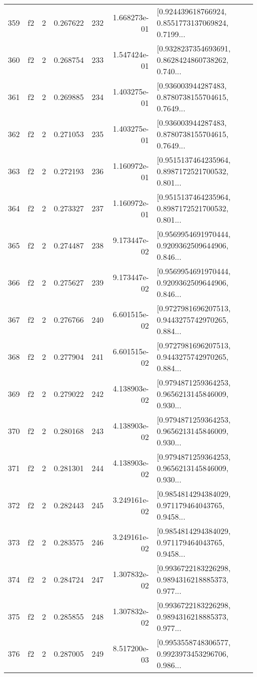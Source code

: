 \begin{tabular}{lllrlrl}
359 &  f2 &   2 &  0.267622 &  232 &  1.668273e-01 &  [0.924439618766924, 0.8551773137069824, 0.7199... \\
360 &  f2 &   2 &  0.268754 &  233 &  1.547424e-01 &  [0.9328237354693691, 0.8628424860738262, 0.740... \\
361 &  f2 &   2 &  0.269885 &  234 &  1.403275e-01 &  [0.936003944287483, 0.8780738155704615, 0.7649... \\
362 &  f2 &   2 &  0.271053 &  235 &  1.403275e-01 &  [0.936003944287483, 0.8780738155704615, 0.7649... \\
363 &  f2 &   2 &  0.272193 &  236 &  1.160972e-01 &  [0.9515137464235964, 0.8987172521700532, 0.801... \\
364 &  f2 &   2 &  0.273327 &  237 &  1.160972e-01 &  [0.9515137464235964, 0.8987172521700532, 0.801... \\
365 &  f2 &   2 &  0.274487 &  238 &  9.173447e-02 &  [0.9569954691970444, 0.9209362509644906, 0.846... \\
366 &  f2 &   2 &  0.275627 &  239 &  9.173447e-02 &  [0.9569954691970444, 0.9209362509644906, 0.846... \\
367 &  f2 &   2 &  0.276766 &  240 &  6.601515e-02 &  [0.9727981696207513, 0.9443275742970265, 0.884... \\
368 &  f2 &   2 &  0.277904 &  241 &  6.601515e-02 &  [0.9727981696207513, 0.9443275742970265, 0.884... \\
369 &  f2 &   2 &  0.279022 &  242 &  4.138903e-02 &  [0.9794871259364253, 0.9656213145846009, 0.930... \\
370 &  f2 &   2 &  0.280168 &  243 &  4.138903e-02 &  [0.9794871259364253, 0.9656213145846009, 0.930... \\
371 &  f2 &   2 &  0.281301 &  244 &  4.138903e-02 &  [0.9794871259364253, 0.9656213145846009, 0.930... \\
372 &  f2 &   2 &  0.282443 &  245 &  3.249161e-02 &  [0.9854814294384029, 0.971179464043765, 0.9458... \\
373 &  f2 &   2 &  0.283575 &  246 &  3.249161e-02 &  [0.9854814294384029, 0.971179464043765, 0.9458... \\
374 &  f2 &   2 &  0.284724 &  247 &  1.307832e-02 &  [0.9936722183226298, 0.9894316218885373, 0.977... \\
375 &  f2 &   2 &  0.285855 &  248 &  1.307832e-02 &  [0.9936722183226298, 0.9894316218885373, 0.977... \\
376 &  f2 &   2 &  0.287005 &  249 &  8.517200e-03 &  [0.9953558748306577, 0.9923973453296706, 0.986... \\

\end{tabular}
